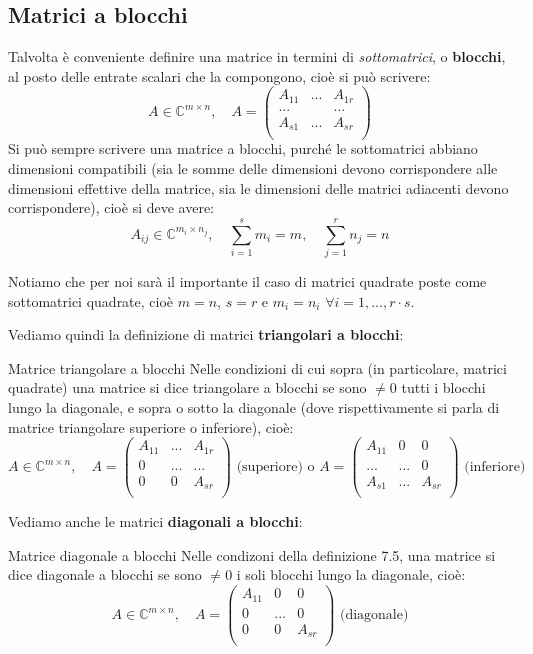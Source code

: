 \documentclass[a4paper,11pt]{article}
\begin{document}
\subsection{Matrici a blocchi}
Talvolta è conveniente definire una matrice in termini di \textit{sottomatrici}, o \textbf{blocchi}, al posto delle entrate scalari che la compongono, cioè si può scrivere:
$$
A \in \mathbb{C}^{m \times n}, \quad A = \begin{pmatrix}
	A_{11} & ... & A_{1r} \\
	... & & ... \\
	A_{s1} & ... & A_{sr} \\
\end{pmatrix}
$$
Si può sempre scrivere una matrice a blocchi, purché le sottomatrici abbiano dimensioni compatibili (sia le somme delle dimensioni devono corrispondere alle dimensioni effettive della matrice, sia le dimensioni delle matrici adiacenti devono corrispondere), cioè si deve avere:
$$
A_{ij} \in \mathbb{C}^{m_i \times n_j}, \quad \sum_{i=1}^s m_i = m, \quad \sum_{j=1}^r n_j = n
$$

Notiamo che per noi sarà il importante il caso di matrici quadrate poste come sottomatrici quadrate, cioè $m = n$, $s = r$ e $m_i = n_i$ $\forall i = 1, ..., r \cdot s$.

Vediamo quindi la definizione di matrici \textbf{triangolari a blocchi}:
\begin{definition}{Matrice triangolare a blocchi}
	Nelle condizioni di cui sopra (in particolare, matrici quadrate) una matrice si dice triangolare a blocchi se sono $\neq 0$ tutti i blocchi lungo la diagonale, e sopra o sotto la diagonale (dove rispettivamente si parla di matrice triangolare superiore o inferiore), cioè:
$$
A \in \mathbb{C}^{m \times n}, \quad A = \begin{pmatrix}
	A_{11} & ... & A_{1r} \\
	0 & ... & ... \\
	0 & 0 & A_{sr} \\
\end{pmatrix} \text{ (superiore) o }
A = \begin{pmatrix}
	A_{11} & 0 & 0 \\
	... & ... & 0 \\
	A_{s1} & ... & A_{sr} \\
\end{pmatrix} \text{ (inferiore)}
$$
\end{definition}

Vediamo anche le matrici \textbf{diagonali a blocchi}:
\begin{definition}{Matrice diagonale a blocchi}
	Nelle condizoni della definizione 7.5, una matrice si dice diagonale a blocchi se sono $\neq 0$ i soli blocchi lungo la diagonale, cioè:
$$
A \in \mathbb{C}^{m \times n}, \quad A = \begin{pmatrix}
	A_{11} & 0 & 0 \\
	0 & ... & 0 \\
	0 & 0 & A_{sr} \\
\end{pmatrix} \text{ (diagonale)}
$$
\end{definition}
\end{document}
